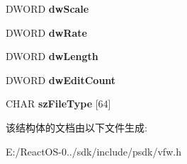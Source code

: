 \begin{DoxyCompactItemize}
D\+W\+O\+RD {\bfseries dw\+Scale}
\item 
\mbox{\label{struct___a_v_i_f_i_l_e_i_n_f_o_a_aeee776da54dffee9db2368d4b48c2f00}} 
D\+W\+O\+RD {\bfseries dw\+Rate}
\item 
\mbox{\label{struct___a_v_i_f_i_l_e_i_n_f_o_a_a68047e6ee1166af6197d3129c20c175b}} 
D\+W\+O\+RD {\bfseries dw\+Length}
\item 
\mbox{\label{struct___a_v_i_f_i_l_e_i_n_f_o_a_a5eefe55ec9ac9380d32d2cac053251a4}} 
D\+W\+O\+RD {\bfseries dw\+Edit\+Count}
\item 
\mbox{\label{struct___a_v_i_f_i_l_e_i_n_f_o_a_a0ed035d63c6b99eb874333dc6779540b}} 
C\+H\+AR {\bfseries sz\+File\+Type} \mbox{[}64\mbox{]}
\end{DoxyCompactItemize}


该结构体的文档由以下文件生成\+:\begin{DoxyCompactItemize}
\item 
E\+:/\+React\+O\+S-\/0../sdk/include/psdk/vfw.\+h\end{DoxyCompactItemize}
